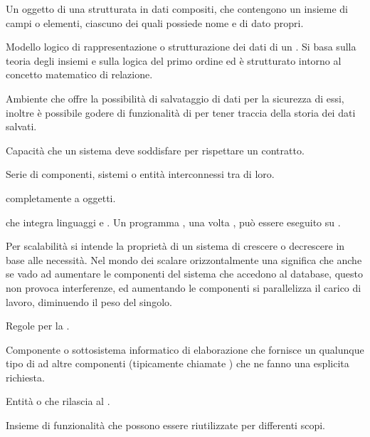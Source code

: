 {Un oggetto di una  strutturata in dati compositi, che contengono un insieme di campi o elementi, ciascuno dei quali possiede nome e  di dato propri.

{Modello logico di rappresentazione o strutturazione dei dati di un . Si basa sulla teoria degli insiemi e sulla logica del primo ordine ed è strutturato intorno al concetto matematico di relazione.}

{Ambiente che offre la possibilità di salvataggio di dati per la sicurezza di essi, inoltre è possibile godere di funzionalità di  per tener traccia della storia dei dati salvati.}

{Capacità che un sistema  deve soddisfare per rispettare un contratto.}

{Serie di componenti, sistemi o entità interconnessi tra di loro.}

{ completamente a oggetti.}




{ che integra linguaggi  e . Un programma , una volta , può essere eseguito su .}

{Per scalabilità si intende la proprietà di un sistema di crescere o decrescere in base alle necessità. Nel mondo dei  scalare orizzontalmente una  significa che anche se vado ad aumentare le componenti del sistema che accedono al database, questo non provoca interferenze, ed aumentando le componenti si parallelizza il carico di lavoro, diminuendo il peso del singolo.}

{Regole per la .}

{Componente o sottosistema informatico di elaborazione che fornisce un qualunque tipo di  ad altre componenti (tipicamente chiamate ) che ne fanno una esplicita richiesta.}

{Entità  o  che rilascia  al .}

{Insieme di funzionalità  che possono essere riutilizzate per differenti scopi.}

}
